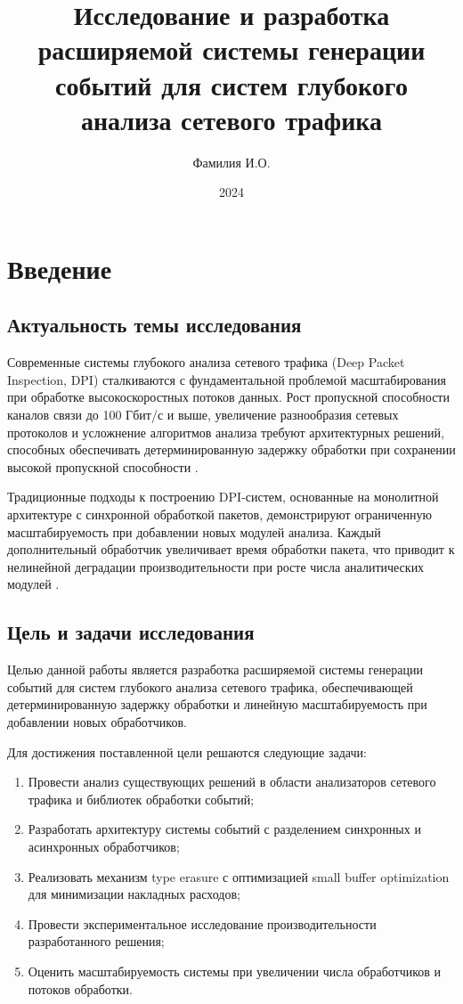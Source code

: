 \documentclass[12pt,a4paper]{report}
\title{Исследование и разработка расширяемой системы генерации событий для систем глубокого анализа сетевого трафика}
\author{Фамилия И.О.}
\date{2024}
\begin{document}
\maketitle
\tableofcontents
\newpage

\chapter{Введение}
\section{Актуальность темы исследования}
Современные системы глубокого анализа сетевого трафика (Deep Packet Inspection, DPI) сталкиваются с фундаментальной проблемой масштабирования при обработке высокоскоростных потоков данных. Рост пропускной способности каналов связи до 100 Гбит/с и выше, увеличение разнообразия сетевых протоколов и усложнение алгоритмов анализа требуют архитектурных решений, способных обеспечивать детерминированную задержку обработки при сохранении высокой пропускной способности \cite{sommer2010outside}.

Традиционные подходы к построению DPI-систем, основанные на монолитной архитектуре с синхронной обработкой пакетов, демонстрируют ограниченную масштабируемость при добавлении новых модулей анализа. Каждый дополнительный обработчик увеличивает время обработки пакета, что приводит к нелинейной деградации производительности при росте числа аналитических модулей \cite{deri2014high}.

\section{Цель и задачи исследования}
Целью данной работы является разработка расширяемой системы генерации событий для систем глубокого анализа сетевого трафика, обеспечивающей детерминированную задержку обработки и линейную масштабируемость при добавлении новых обработчиков.

Для достижения поставленной цели решаются следующие задачи:
\begin{enumerate}
    \item Провести анализ существующих решений в области анализаторов сетевого трафика и библиотек обработки событий;
    \item Разработать архитектуру системы событий с разделением синхронных и асинхронных обработчиков;
    \item Реализовать механизм type erasure с оптимизацией small buffer optimization для минимизации накладных расходов;
    \item Провести экспериментальное исследование производительности разработанного решения;
    \item Оценить масштабируемость системы при увеличении числа обработчиков и потоков обработки.
\end{enumerate}
\end{document}
